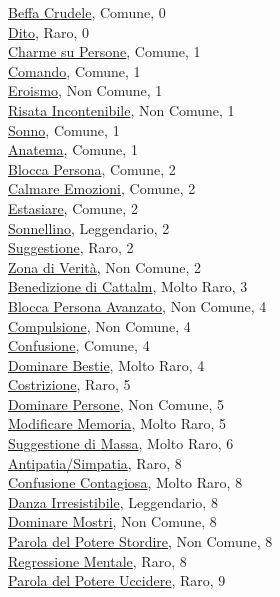 \begin{multicols}{3}
{{\hyperlink{Beffa Crudele}{Beffa Crudele}, Comune, 0\\
\hyperlink{Dito}{Dito}, Raro, 0\\
\hyperlink{Charme su Persone}{Charme su Persone}, Comune, 1\\
\hyperlink{Comando}{Comando}, Comune, 1\\
\hyperlink{Eroismo}{Eroismo}, Non Comune, 1\\
\hyperlink{Risata Incontenibile}{Risata Incontenibile}, Non Comune, 1\\
\hyperlink{Sonno}{Sonno}, Comune, 1\\
\hyperlink{Anatema}{Anatema}, Comune, 1\\
\hyperlink{Blocca Persona}{Blocca Persona}, Comune, 2\\
\hyperlink{Calmare Emozioni}{Calmare Emozioni}, Comune, 2\\
\hyperlink{Estasiare}{Estasiare}, Comune, 2\\
\hyperlink{Sonnellino}{Sonnellino}, Leggendario, 2\\
\hyperlink{Suggestione}{Suggestione}, Raro, 2\\
\hyperlink{Zona di Verità}{Zona di Verità}, Non Comune, 2\\
\hyperlink{Benedizione di Cattalm}{Benedizione di Cattalm}, Molto Raro, 3\\
\hyperlink{Blocca Persona Avanzato}{Blocca Persona Avanzato}, Non Comune, 4\\
\hyperlink{Compulsione}{Compulsione}, Non Comune, 4\\
\hyperlink{Confusione}{Confusione}, Comune, 4\\
\hyperlink{Dominare Bestie}{Dominare Bestie}, Molto Raro, 4\\
\hyperlink{Costrizione}{Costrizione}, Raro, 5\\
\hyperlink{Dominare Persone}{Dominare Persone}, Non Comune, 5\\
\hyperlink{Modificare Memoria}{Modificare Memoria}, Molto Raro, 5\\
\hyperlink{Suggestione di Massa}{Suggestione di Massa}, Molto Raro, 6\\
\hyperlink{Antipatia/Simpatia}{Antipatia/Simpatia}, Raro, 8\\
\hyperlink{Confusione Contagiosa}{Confusione Contagiosa}, Molto Raro, 8\\
\hyperlink{Danza Irresistibile}{Danza Irresistibile}, Leggendario, 8\\
\hyperlink{Dominare Mostri}{Dominare Mostri}, Non Comune, 8\\
\hyperlink{Parola del Potere Stordire}{Parola del Potere Stordire}, Non Comune, 8\\
\hyperlink{Regressione Mentale}{Regressione Mentale}, Raro, 8\\
\hyperlink{Parola del Potere Uccidere}{Parola del Potere Uccidere}, Raro, 9

}}
\end{multicols}
